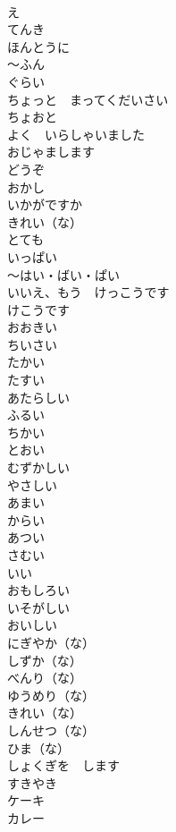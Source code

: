 \documentclass[8pt]{extreport}
\begin{document}
\begin{CJK}{UTF8}{min}
\\	え		
\\	てんき		
\\	ほんとうに		
\\	〜ふん		
\\	ぐらい		
\\	ちょっと　まってくだいさい		
\\	ちょおと		
\\	よく　いらしゃいました		
\\	おじゃまします		
\\	どうぞ		
\\	おかし		
\\	いかがですか		
\\	きれい（な）		
\\	とても		
\\	いっぱい		
\\	〜はい・ばい・ぱい		
\\	いいえ、もう　けっこうです		
\\	けこうです		
\\	おおきい		
\\	ちいさい		
\\	たかい		
\\	たすい		
\\	あたらしい		
\\	ふるい		
\\	ちかい		
\\	とおい		
\\	むずかしい		
\\	やさしい		
\\	あまい		
\\	からい		
\\	あつい		
\\	さむい		
\\	いい		
\\	おもしろい		
\\	いそがしい		
\\	おいしい		
\\	にぎやか（な）		
\\	しずか（な）		
\\	べんり（な）		
\\	ゆうめり（な）		
\\	きれい（な）		
\\	しんせつ（な）		
\\	ひま（な）		
\\	しょくぎを　します		
\\	すきやき		
\\	ケーキ		
\\	カレー		

\end{CJK}
\end{document}
